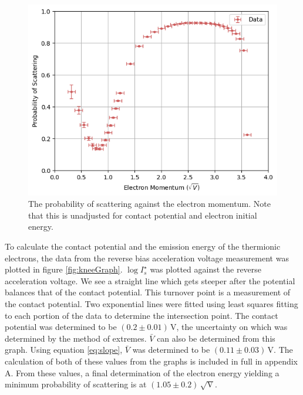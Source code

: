 \documentclass[%
reprint,
amsmath,amssymb,
aps,
floatfix
]{revtex4-2}
\begin{document}
	\begin{figure}
		\includegraphics[width=\columnwidth]{probabilityOfScattering.png}
		\caption{\label{fig:probabilityOfScattering}The probability of scattering against the electron momentum. Note that this is unadjusted for contact potential and electron initial energy.}
	\end{figure}
	
	To calculate the contact potential and the emission energy of the thermionic electrons, the data from the reverse bias acceleration voltage measurement was plotted in figure \ref{fig:kneeGraph}. $\log{I_s^\star}$ was plotted against the reverse acceleration voltage. We see a straight line which gets steeper after the potential balances that of the contact potential. This turnover point is a measurement of the contact potential. Two exponential lines were fitted using least squares fitting to each portion of the data to determine the intersection point. The contact potential was determined to be $(0.2 \pm 0.01) \,\text{V}$, the uncertainty on which was determined by the method of extremes. $\bar{V}$ can also be determined from this graph. Using equation \ref{eq:slope}, $\bar{V}$ was determined to be $(0.11 \pm 0.03) \,\text{V}$. The calculation of both of these values from the graphs is included in full in appendix A. From these values, a final determination of the electron energy yielding a minimum probability of scattering is at $(1.05 \pm 0.2) \,\sqrt{\text{V}}$.
	
\end{document}
